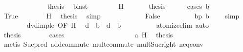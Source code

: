 \begin{isabellebody}
\ \ \ \ \isamarkupfalse%
\ {}\isanewline
\ \ \ \ \isamarkupfalse%
\ \isamarkupfalse%
\ {\isacharquery}{\kern0pt}thesis\ \isamarkupfalse%
\ blast\isanewline
\ \ \isamarkupfalse%
\isanewline
\ \ \ \ \isamarkupfalse%
\ H{\isacharcolon}{\kern0pt}\ {}\isanewline
\ \ \ \ \isamarkupfalse%
\ {\isacharquery}{\kern0pt}thesis\isanewline
\ \ \ \ \isamarkupfalse%
\ {\isacharparenleft}{\kern0pt}cases\ {\isachardoublequoteopen}b\ {\isacharequal}{\kern0pt}\ {}{\isachardoublequoteclose}{\isacharparenright}{\kern0pt}\isanewline
\ \ \ \ \ \ \isamarkupfalse%
\ True\isanewline
\ \ \ \ \ \ \isamarkupfalse%
\ H\ \isamarkupfalse%
\ {\isacharquery}{\kern0pt}thesis\ \isamarkupfalse%
\ simp\isanewline
\ \ \ \ \isamarkupfalse%
\isanewline
\ \ \ \ \ \ \isamarkupfalse%
\ False\isanewline
\ \ \ \ \ \ \isamarkupfalse%
\ \isamarkupfalse%
\ bp{\isacharcolon}{\kern0pt}\ {\isachardoublequoteopen}b\ {\isachargreater}{\kern0pt}\ {}{\isachardoublequoteclose}\ \isamarkupfalse%
\ simp\isanewline
\ \ \ \ \ \ \isamarkupfalse%
\ dvd{\isacharunderscore}{\kern0pt}imp{\isacharunderscore}{\kern0pt}le\ {\isacharbrackleft}{\kern0pt}OF\ H{\isacharparenleft}{\kern0pt}{}{\isacharparenright}{\kern0pt}{\isacharbrackright}{\kern0pt}\ \isamarkupfalse%
\ {\isachardoublequoteopen}d\ {\isacharequal}{\kern0pt}\ b{\isachardoublequoteclose}\ {\isacharbar}{\kern0pt}\ {\isachardoublequoteopen}d\ {\isacharless}{\kern0pt}\ b{\isachardoublequoteclose}\isanewline
\ \ \ \ \ \ \ \ \isamarkupfalse%
\ atomize{\isacharunderscore}{\kern0pt}elim\ auto\isanewline
\ \ \ \ \ \ \isamarkupfalse%
\ \isamarkupfalse%
\ {\isacharquery}{\kern0pt}thesis\isanewline
\ \ \ \ \ \ \isamarkupfalse%
\ cases\isanewline
\ \ \ \ \ \ \ \ \isamarkupfalse%
\ {}\isanewline
\ \ \ \ \ \ \ \ \isamarkupfalse%
\ a\ H\ \isamarkupfalse%
\ {\isacharquery}{\kern0pt}thesis\isanewline
\ \ \ \ \ \ \ \ \ \ \isamarkupfalse%
\ {\isacharparenleft}{\kern0pt}metis\ Suc{\isacharunderscore}{\kern0pt}pred\ add{\isachardot}{\kern0pt}commute\ mult{\isachardot}{\kern0pt}commute\ mult{\isacharunderscore}{\kern0pt}Suc{\isacharunderscore}{\kern0pt}right\ neq{}{\isacharunderscore}{\kern0pt}conv{\isacharparenright}{\kern0pt}\isanewline

\end{isabellebody}
